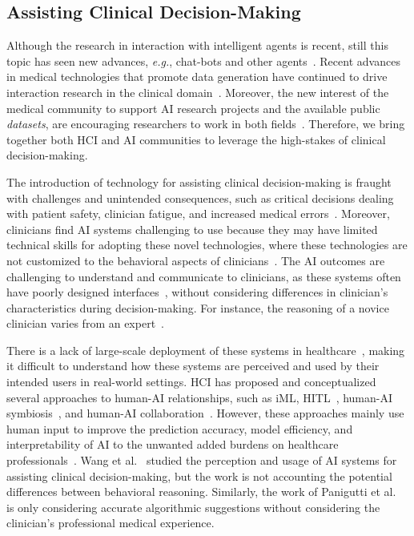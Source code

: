 \subsection{Assisting Clinical Decision-Making}
\label{sec:app005003002}

Although the research in interaction with intelligent agents is recent, still this topic has seen new advances, {\it e.g.}, chat-bots and other agents~\cite{miller2019intrinsically}.
Recent advances in medical technologies that promote data generation have continued to drive interaction research in the clinical domain~\cite{azuaje2019artificial, Lopes:2017:UHC:3143820.3144118}.
Moreover, the new interest of the medical community to support \ac{AI} research projects and the available public {\it datasets}, are encouraging researchers to work in both fields~\cite{lau2018dataset}.
Therefore, we bring together both \ac{HCI} and \ac{AI} communities to leverage the high-stakes of clinical decision-making.

The introduction of technology for assisting clinical decision-making is fraught with challenges and unintended consequences, such as critical decisions dealing with patient safety, clinician fatigue, and increased medical errors~\cite{10.1093/jamia/ocab291, 10.1117/12.2613082, doi:10.1148/radiol.212631}.
Moreover, clinicians find \ac{AI} systems challenging to use because they may have limited technical skills for adopting these novel technologies, where these technologies are not customized to the behavioral aspects of clinicians~\cite{CALISTO2022102922}.
The \ac{AI} outcomes are challenging to understand and communicate to clinicians, as these systems often have poorly designed interfaces~\cite{10.1145/3555157}, without considering differences in clinician's characteristics during decision-making.
For instance, the reasoning of a novice clinician varies from an expert~\cite{Edgar2022}.

There is a lack of large-scale deployment of these systems in healthcare~\cite{10.1145/3411764.3445432, SU202328, ZAPPATORE20231}, making it difficult to understand how these systems are perceived and used by their intended users in real-world settings.
\ac{HCI} has proposed and conceptualized several approaches to human-AI relationships, such as \ac{iML}, \ac{HITL}~\cite{10.1145/3397481.3450668}, human-\ac{AI} symbiosis~\cite{JARRAHI2018577}, and human-\ac{AI} collaboration~\cite{10.1145/3411764.3445432}.
However, these approaches mainly use human input to improve the prediction accuracy, model efficiency, and interpretability of \ac{AI} to the unwanted added burdens on healthcare professionals~\cite{10.1145/3555157, 10.1145/3209889.3209897}.
Wang et al.~\cite{10.1145/3411764.3445432} studied the perception and usage of \ac{AI} systems for assisting clinical decision-making, but the work is not accounting the potential differences between behavioral reasoning.
Similarly, the work of Panigutti et al.~\cite{10.1145/3491102.3502104} is only considering accurate algorithmic suggestions without considering the clinician's professional medical experience.

